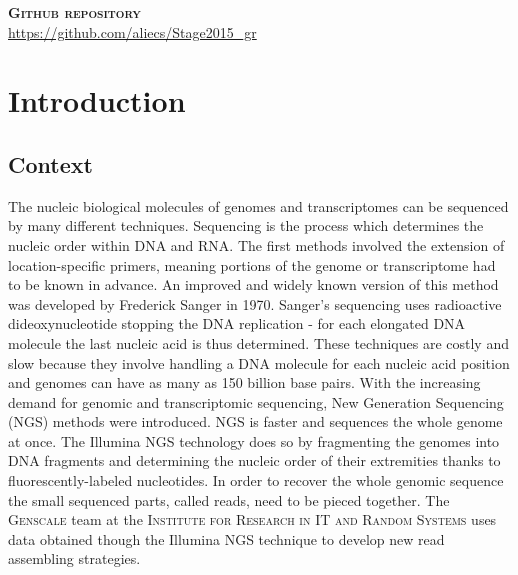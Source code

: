 \documentclass[12pt]{article}
\begin{document}
\vspace{2cm}
\textbf{\textsc{Github repository}}\\
\hspace*{1cm} \url{https://github.com/aliecs/Stage2015_gr}








\thispagestyle{empty}
\clearpage
\hypersetup{linkcolor=gray}
\tableofcontents
\thispagestyle{empty}
\newpage
\section{Introduction}
\setcounter{page}{1}
\subsection{Context}
The nucleic biological molecules of genomes and transcriptomes can be sequenced by many different techniques. Sequencing is the process which determines the nucleic order within DNA and RNA. The first methods involved the extension of location-specific primers, meaning portions of the genome or transcriptome had to be known in advance. An improved and widely known version of this method was developed by Frederick Sanger in 1970. Sanger's sequencing uses radioactive dideoxynucleotide stopping the DNA replication - for each elongated DNA molecule the last nucleic acid is thus determined. These techniques are costly and slow because they involve handling a DNA molecule for each nucleic acid position and genomes can have as many as 150 billion base pairs. With the increasing demand for genomic and transcriptomic sequencing, New Generation Sequencing (NGS) methods were introduced. NGS is faster and sequences the whole genome at once. The Illumina NGS technology does so by fragmenting the genomes into DNA fragments and determining the nucleic order of their extremities thanks to fluorescently-labeled nucleotides. In order to recover the whole genomic sequence the small sequenced parts, called reads, need to be pieced together. The \textsc{Genscale} team at the \textsc{Institute for Research in IT and Random Systems} uses data obtained though the Illumina NGS technique to develop new read assembling strategies.
\end{document}
